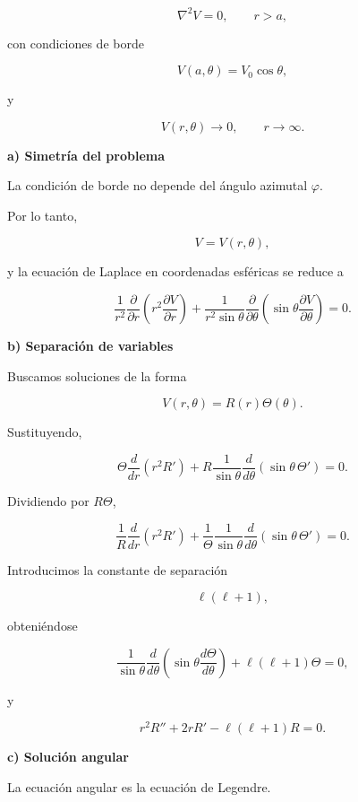 \documentclass[11pt,spanish]{article}
\newcounter{problema}
\begin{document}
\[
\nabla^2V=0,
\qquad
r>a,
\]

con condiciones de borde

\[
V(a,\theta)=V_0\cos\theta,
\]

y

\[
V(r,\theta)\longrightarrow0,
\qquad
r\rightarrow\infty.
\]


{\bf a) Simetría del problema}

La condición de borde no depende del ángulo azimutal \(\varphi\).

Por lo tanto,

\[
V=V(r,\theta),
\]

y la ecuación de Laplace en coordenadas esféricas se reduce a

\[
\boxed{
\frac1{r^2}
\frac{\partial}{\partial r}
\left(
r^2
\frac{\partial V}{\partial r}
\right)
+
\frac1{r^2\sin\theta}
\frac{\partial}{\partial\theta}
\left(
\sin\theta
\frac{\partial V}{\partial\theta}
\right)
=0.
}
\]


{\bf b) Separación de variables}

Buscamos soluciones de la forma

\[
V(r,\theta)=R(r)\Theta(\theta).
\]

Sustituyendo,

\[
\Theta
\frac{d}{dr}
\left(
r^2R'
\right)
+
R
\frac1{\sin\theta}
\frac{d}{d\theta}
\left(
\sin\theta\,\Theta'
\right)
=0.
\]

Dividiendo por \(R\Theta\),

\[
\frac1R
\frac{d}{dr}
(r^2R')
+
\frac1\Theta
\frac1{\sin\theta}
\frac{d}{d\theta}
(\sin\theta\,\Theta')
=0.
\]

Introducimos la constante de separación

\[
\ell(\ell+1),
\]

obteniéndose

\[
\boxed{
\frac1{\sin\theta}
\frac{d}{d\theta}
\left(
\sin\theta
\frac{d\Theta}{d\theta}
\right)
+
\ell(\ell+1)\Theta=0,
}
\]

y

\[
\boxed{
r^2R''
+2rR'
-\ell(\ell+1)R=0.
}
\]


{\bf c) Solución angular}

La ecuación angular es la ecuación de Legendre.
\end{document}
